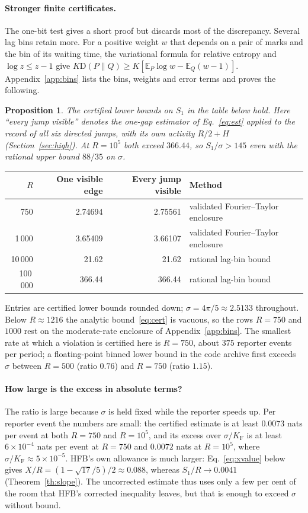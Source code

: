 \documentclass[11pt,a4paper]{article}
\newtheorem{proposition}[theorem]{Proposition}
\newcommand{\KL}{\mathrm D}
\newcommand{\F}{\mathrm F}
\begin{document}
\paragraph{Stronger finite certificates.} The one-bit test gives a short proof but discards most of the discrepancy. Several lag bins retain more. For a positive weight $w$ that depends on a pair of marks and the bin of its waiting time, the variational formula for relative entropy and $\log z\le z-1$ give $K\KL(P\|Q)\geq K[\mathbb E_P\log w-\mathbb E_Q(w-1)]$. Appendix~\ref{app:bins} lists the bins, weights and error terms and proves the following.
\begin{proposition}\label{prop:bins}
The certified lower bounds on $S_1$ in the table below hold. Here ``every jump visible'' denotes the one-gap estimator of Eq.~\eqref{eq:est} applied to the record of all six directed jumps, with its own activity $R/2+H$ (Section~\ref{sec:high}). At $R=10^5$ both exceed $366.44$, so $S_1/\sigma>145$ even with the rational upper bound $88/35$ on $\sigma$.
\end{proposition}
\begin{center}
\begin{tabular}{rrrl}\toprule
$R$ & One visible edge & Every jump visible & Method\\\midrule
750 & 2.74694 & 2.75561 & validated Fourier--Taylor enclosure\\
1\,000 & 3.65409 & 3.66107 & validated Fourier--Taylor enclosure\\
10\,000 & 21.62 & 21.62 & rational lag-bin bound\\
100\,000 & 366.44 & 366.44 & rational lag-bin bound\\\bottomrule
\end{tabular}
\end{center}
Entries are certified lower bounds rounded down; $\sigma=4\pi/5\approx2.5133$ throughout. Below $R\approx1216$ the analytic bound~\eqref{eq:cert} is vacuous, so the rows $R=750$ and $1000$ rest on the moderate-rate enclosure of Appendix~\ref{app:bins}. The smallest rate at which a violation is certified here is $R=750$, about $375$ reporter events per period; a floating-point binned lower bound in the code archive first exceeds $\sigma$ between $R=500$ (ratio $0.76$) and $R=750$ (ratio $1.15$).

\paragraph{How large is the excess in absolute terms?} The ratio is large because $\sigma$ is held fixed while the reporter speeds up. Per reporter event the numbers are small: the certified estimate is at least $0.0073$ nats per event at both $R=750$ and $R=10^5$, and its excess over $\sigma/K_\F$ is at least $6\times10^{-4}$ nats per event at $R=750$ and $0.0072$ nats at $R=10^5$, where $\sigma/K_\F\approx5\times10^{-5}$. HFB's own allowance is much larger: Eq.~\eqref{eq:xvalue} below gives $X/R=(1-\sqrt{17}/5)/2\approx0.088$, whereas $S_1/R\to0.0041$ (Theorem~\ref{th:slope}). The uncorrected estimate thus uses only a few per cent of the room that HFB's corrected inequality leaves, but that is enough to exceed $\sigma$ without bound.
\end{document}
